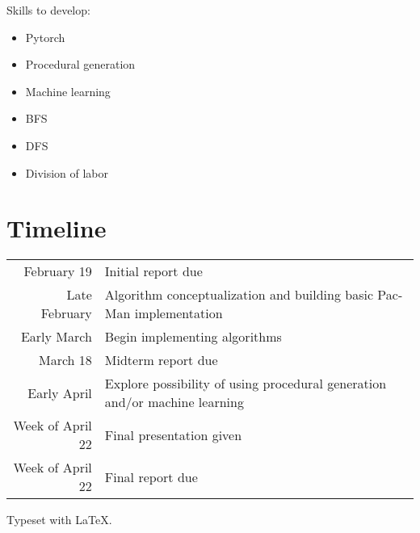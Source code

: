 \documentclass[12pt]{article}
\begin{document}
        \newpage
        Skills to develop:
        \begin{multicols}{2}
            \begin{itemize}
                \itemsep-4pt
                \item Pytorch
                \item Procedural generation
                \item Machine learning
                \item BFS
                \item DFS
                \item Division of labor
            \end{itemize}
        \end{multicols}
    \section{Timeline}
        \begin{table}[H]
            \begin{tabular}{rl}
                February 19 & Initial report due\\
                Late February & Algorithm conceptualization and building basic Pac-Man implementation\\
                Early March & Begin implementing algorithms\\
                March 18 & Midterm report due\\
                Early April & Explore possibility of using procedural generation and/or machine learning\\
                Week of April 22 & Final presentation given\\
                Week of April 22 & Final report due
            \end{tabular}
        \end{table}
    
    
    \vfill
    Typeset with \LaTeX.
\end{document}

